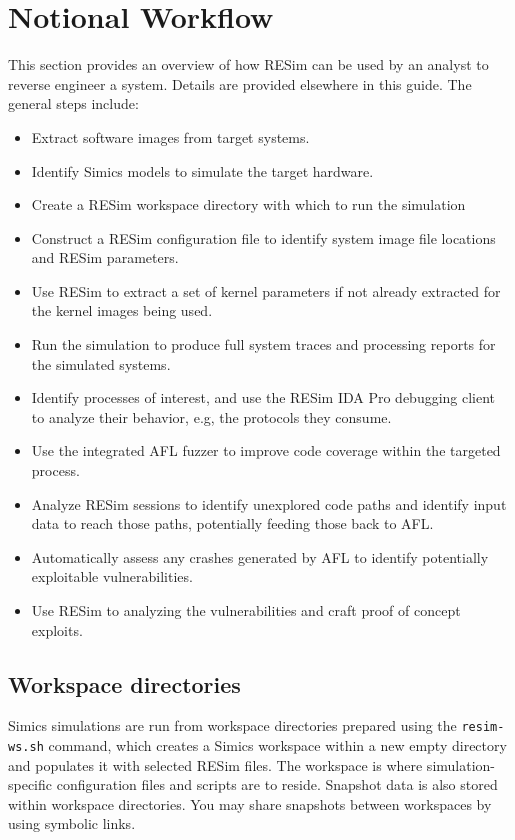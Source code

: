 \documentclass[titlepage]{article}
\begin{document}
\section{Notional Workflow}
\label{workflow}
This section provides an overview of how RESim can be used by an analyst to reverse engineer a system. Details are provided elsewhere
in this guide.  The general steps include:
\begin{itemize}
\item Extract software images from target systems.
\item Identify Simics models to simulate the target hardware.
\item Create a RESim workspace directory with which to run the simulation
\item Construct a RESim configuration file to identify system image file locations and RESim parameters.
\item Use RESim to extract a set of kernel parameters if not already extracted for the kernel images being used.
\item Run the simulation to produce full system traces and processing reports for the simulated systems.
\item Identify processes of interest, and use the RESim IDA Pro debugging client to analyze their behavior, e.g, the protocols they consume.
\item Use the integrated AFL fuzzer to improve code coverage within the targeted process.
\item Analyze RESim sessions to identify unexplored code paths and identify input data to reach those paths, potentially feeding those back to AFL.
\item Automatically assess any crashes generated by AFL to identify potentially exploitable vulnerabilities.
\item Use RESim to analyzing the vulnerabilities and craft proof of concept exploits.
\end{itemize}

\subsection{Workspace directories}
Simics simulations are run from workspace directories prepared using the {\tt resim-ws.sh} command, which creates a Simics workspace within a new empty
directory and populates it with selected RESim files.  The workspace is where simulation-specific configuration files and scripts are to reside.  Snapshot
data is also stored within workspace directories.  You may share snapshots between workspaces by using symbolic links.  
\end{document}
